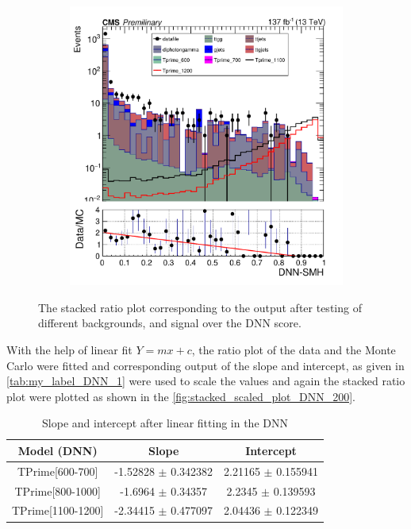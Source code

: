 \begin{figure}[H]
\begin{subfigure}[b]{0.3\textwidth}
     \end{subfigure}
     \hfill
     \begin{subfigure}[b]{0.3\textwidth}
         \centering
         \includegraphics[width=\textwidth]{figure_4/Stacked_plot_DNN_1100-1200_with_diphoton_cuts.pdf}
     \end{subfigure}
    \label{fig:stacked_plot_DNN_100}
    \caption{The stacked ratio plot corresponding to the output after testing of different backgrounds, and signal over the DNN score.}
\end{figure}

With the help of linear fit $Y = mx+c$, the ratio plot of the data and the Monte Carlo were fitted and corresponding output of the slope and intercept, as given in \autoref{tab:my_label_DNN_1} were used to scale the values and again the stacked ratio plot were plotted as shown in the \autoref{fig:stacked_scaled_plot_DNN_200}. 


\begin{table}[H]
    \centering
    \begin{tabular}{|c|c|c|}\hline
     Model (DNN)   & Slope & Intercept \\ \hline
      TPrime[600-700]   &  -1.52828 $\pm$ 0.342382 & 2.21165 $\pm$ 0.155941  \\
       TPrime[800-1000]   &  -1.6964 $\pm$ 0.34357 & 2.2345 $\pm$ 0.139593 \\
          TPrime[1100-1200]   &  -2.34415 $\pm$ 0.477097 &  2.04436 $\pm$  0.122349  \\\hline
    \end{tabular}
    \caption{Slope and intercept after linear fitting in the DNN}
    \label{tab:my_label_DNN_1}
\end{table}




